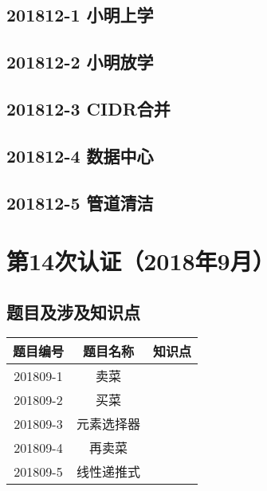 \documentclass[cn,10pt,math=newtx,citestyle=gb7714-2015,bibstyle=gb7714-2015]{elegantbook}
\newif\ifonlyanalyze %
\begin{document}
\newpage
\section{201812-1 小明上学}
\ifonlyanalyze
\else
    
\fi


\newpage
\section{201812-2 小明放学}
\ifonlyanalyze
\else
    
\fi


\newpage
\section{201812-3 CIDR合并}
\ifonlyanalyze
\else
    
\fi


\newpage
\section{201812-4 数据中心}
\ifonlyanalyze
\else
    
\fi


\newpage
\section{201812-5 管道清洁}
\ifonlyanalyze
\else
    
\fi



\chapter{第14次认证（2018年9月）}

\section{题目及涉及知识点}

\begin{table}[htbp]
    \centering
    \begin{tabular}{ccc}
        \toprule
        题目编号 & 题目名称   & 知识点 \\
        \midrule
        201809-1 & 卖菜       &        \\
        201809-2 & 买菜       &        \\
        201809-3 & 元素选择器 &        \\
        201809-4 & 再卖菜     &        \\
        201809-5 & 线性递推式 &        \\
        \bottomrule
    \end{tabular}
\end{table}
\end{document}
